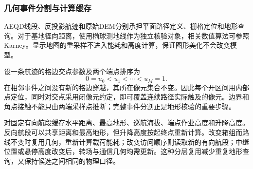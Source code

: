 \subsubsection{几何事件分割与计算缓存}
AEQD线段、反投影航迹和原始DEM分别承担平面路径定义、栅格定位和地形查询。对于基地径向距离，使用椭球测地线作为独立核验对象，相关数值算法可参照Karney\cite{karney2013}。显示地图的重采样不进入能耗和高度计算，保证图形美化不会改变模型。

设一条航迹的格边交点参数及两个端点排序为
\begin{equation}
0=u_0<u_1<\cdots<u_M=1.
\label{eq:geometry_breakpoints}
\end{equation}
在相邻事件之间没有新的格边穿越，其所在像元集合不变。因此每个开区间用内部点定位，同时对交点采用闭像元约定，即可覆盖连续路径实际触及的像元。边界和角点接触不能只由两端采样点推断；完整事件分割正是地形核验的重要步骤。

对固定有向航段缓存水平距离、最高地形、巡航海拔、端点作业高度和升降高度。反向航段可以共享距离和最高地形，但升降高度按起终点重新计算。改变箱组而路线不变时复用几何，重新计算载荷能耗；改变访问顺序则读取新的有向航段；中继位置或悬停高度改变后，转场与通信几何均需更新。这种分层复用减少重复地形查询，又保持候选之间相同的物理口径。
